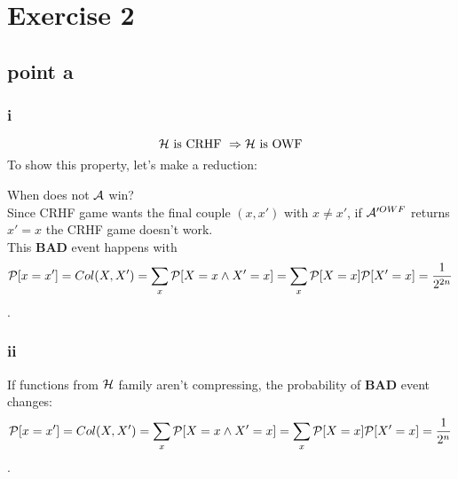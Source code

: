 \chapter*{Exercise 2}

\section{point a}
\subsection{ i}%

\[
    \H \text{ is CRHF } \Rightarrow \H \text{ is OWF}
\]
To show this property, let's make a reduction:
\begin{figure}[h!]
   \centering
   \sdinit{}
\end{figure}

When does not $\A$ win?\\
Since CRHF game  wants the final couple $(x, x')$ with $x\not= x'$, if
$\A'^{OWF}$ returns $x'=x$ the CRHF game doesn't work.\\

This \textbf{BAD} event happens with 
\[
    \P [ x=x' ]=Col(X, X')=\sum_{x}^{} \P [ X=x \wedge X'=x ]= \sum_{x}^{} \P [X=x] \P [ X'=x ] = \frac{1}{2^{2n}}        
\].
\subsection{ ii}%

If functions from $\H$ family aren't compressing, the probability of
\textbf{BAD} event changes:
\[
    \P [ x=x' ]=Col(X, X')=\sum_{x}^{} \P [ X=x \wedge X'=x ]= \sum_{x}^{} \P [X=x] \P [ X'=x ] = \frac{1}{2^{n}}        
\].

